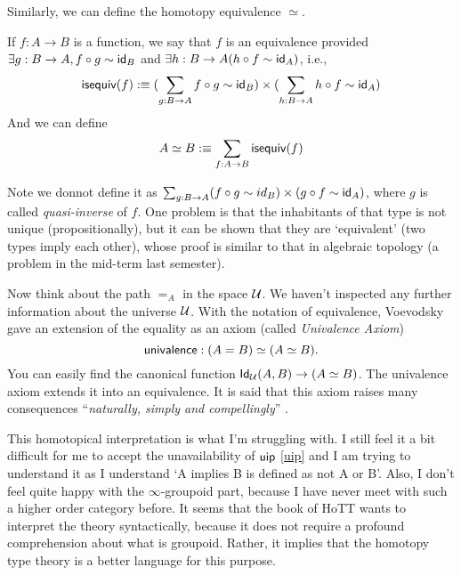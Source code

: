 \newcommand{\isequiv}{\name{isequiv}}
Similarly, we can define the homotopy equivalence $\simeq$.
\begin{definition}
    If $f:A\to B$ is a function, we say that $f$ is an equivalence provided
    $\exists g:B\to A,f\circ g\sim \text{\sf id}_B$ and 
    $\exists h:B\to A(h\circ f\sim \text{\sf id}_A)$, i.e., 
    $$
        \isequiv(f)\defn(\sum_{g:B\to A}f\circ g\sim \id_B)\times
        (\sum_{h:B\to A}h\circ f\sim \id_A)
    $$
    And we can define
    $$
        A\simeq B\defn\sum_{f:A\to B}\isequiv(f)
    $$
\end{definition}

Note we donnot define it as $\sum_{g:B\to A}(f\circ g\sim id_B)\times
(g\circ f\sim \text{\sf id}_A)$, where $g$ is called {\it quasi-inverse} of $f$.
One problem is that the inhabitants of that type is not unique 
(propositionally), but it can be shown that they are `equivalent' (two 
types imply each other), whose proof is similar to that in algebraic 
topology (a problem in the mid-term last semester). 

Now think about the path $=_A$ in the space $\mathcal{U}$. We haven't 
inspected any further information about the universe $\mathcal{U}$.
With the notation of equivalence, Voevodsky gave an extension of the
equality as an axiom (called {\it Univalence Axiom})
\newcommand{\univalence}{\name{univalence}}
$$
    \univalence: (A=B)\simeq(A\simeq B).
$$
You can easily find the canonical function $\text{\sf Id}_{\mathcal{U}}(A,B)\to(A\simeq B)$. 
The univalence axiom extends it into an equivalence. It is said that this
axiom raises many consequences ``{\it naturally, simply and compellingly}''
\cite{homotopy-type-theory}. 

This homotopical interpretation is what I'm struggling with. I still
feel it a bit difficult for me to accept the unavailability of $\text{\sf uip}$
\eqref{uip} and I am trying to understand it as I understand `A implies B
is defined as not A or B'. Also, I don't feel quite happy with the
$\infty$-groupoid part, because I have never meet with such a higher
order category before. It seems that the book of HoTT\cite{homotopy-type-theory} 
wants to interpret the theory syntactically, because it does not require a 
profound comprehension about what is groupoid. Rather, it implies that the
homotopy type theory is a better language for this purpose. 

